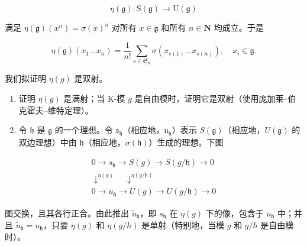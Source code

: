 \[
\eta (\mathfrak {g}): \mathrm{S} (\mathfrak {g}) \rightarrow \mathrm{U} (\mathfrak {g})
\]

满足 \(\eta (\mathfrak{g})(x^n) = \sigma (x)^n\) 对所有 \(x\in \mathfrak{g}\) 和所有 \(n\in \mathbf{N}\) 均成立。于是

\[
\eta (\mathfrak {g}) (x _ {1} \dots x _ {n}) = \frac {1}{n !} \sum_ {s \in \mathfrak {S} _ {n}} \sigma (x _ {s (1)} \dots x _ {s (n)}), \quad x _ {i} \in \mathfrak {g}.
\]

我们拟证明 \(\eta(g)\) 是双射。

\begin{enumerate}
\def\labelenumi{(\alph{enumi})}
\item
  证明 \(\eta(g)\) 是满射；当 K-模 \(g\) 是自由模时，证明它是双射（使用庞加莱–伯克霍夫–维特定理）。
\item
  令 \(\mathfrak{h}\) 是 \(\mathfrak{g}\) 的一个理想。令 \(\mathfrak{s}_{\mathfrak{h}}\)（相应地，\(\mathfrak{u}_{\mathfrak{h}}\)）表示 \(S(\mathfrak{g})\)（相应地，\(U(\mathfrak{g})\) 的双边理想）中由 \(\mathfrak{h}\)（相应地，\(\sigma(\mathfrak{h})\)）生成的理想。下图
\end{enumerate}

\[
\begin{array}{c} 0 \to s _ {\mathfrak {h}} \to S (g) \to S (g / \mathfrak {h}) \to 0 \\ \downarrow^ {\eta (g)} \quad \downarrow^ {\eta (g / \mathfrak {h})} \\ 0 \to u _ {\mathfrak {h}} \to U (g) \to U (g / \mathfrak {h}) \to 0 \end{array}
\]

图交换，且其各行正合。由此推出 \(\tilde{u}_{\mathfrak{h}}\)，即 \(s_{\mathfrak{h}}\) 在 \(\eta(g)\) 下的像，包含于 \(u_{\mathfrak{h}}\) 中；并且 \(\tilde{u}_{\mathfrak{h}} = u_{\mathfrak{h}}\)，只要 \(\eta(g)\) 和 \(\eta(g/h)\) 是单射（特别地，当模 \(g\) 和 \(g/h\) 是自由模时）。

